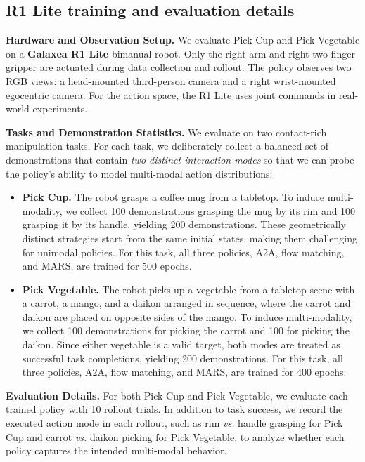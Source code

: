 \subsection{R1 Lite training and evaluation details}

\textbf{Hardware and Observation Setup.}
We evaluate Pick Cup and Pick Vegetable on a \textbf{Galaxea R1 Lite} bimanual robot. Only the right arm and right two-finger gripper are actuated during data collection and rollout. The policy observes two RGB views: a head-mounted third-person camera and a right wrist-mounted egocentric camera. For the action space, the R1 Lite uses joint commands in real-world experiments.

\textbf{Tasks and Demonstration Statistics.}
We evaluate on two contact-rich manipulation tasks. For each task, we deliberately collect a balanced set of demonstrations that contain \emph{two distinct interaction modes} so that we can probe the policy's ability to model multi-modal action distributions:

\begin{itemize}[leftmargin=1em, labelsep=0.4em, itemsep=0.25em, topsep=0.25em]
\item \textbf{Pick Cup.} The robot grasps a coffee mug from a tabletop. To induce multi-modality, we collect 100 demonstrations grasping the mug {by its rim} and 100 grasping it {by its handle}, yielding {200 demonstrations}. These geometrically distinct strategies start from the same initial states, making them challenging for unimodal policies. For this task, all three policies, A2A, flow matching, and MARS, are trained for 500 epochs.

\item \textbf{Pick Vegetable.}
The robot picks up a vegetable from a tabletop scene with a carrot, a mango, and a daikon arranged in sequence, where the carrot and daikon are placed on opposite sides of the mango. To induce multi-modality, we collect 100 demonstrations for picking the {carrot} and 100 for picking the {daikon}. Since either vegetable is a valid target, both modes are treated as successful task completions, yielding {200 demonstrations}. For this task, all three policies, A2A, flow matching, and MARS, are trained for 400 epochs. 

\end{itemize}
\textbf{Evaluation Details.}
For both Pick Cup and Pick Vegetable, we evaluate each trained policy with 10 rollout trials. In addition to task success, we record the executed action mode in each rollout, such as rim \textit{vs.} handle grasping for Pick Cup and carrot \textit{vs.} daikon picking for Pick Vegetable, to analyze whether each policy captures the intended multi-modal behavior.

